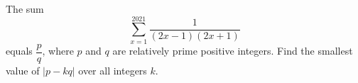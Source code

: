 The sum
\[\sum_{x=1}^{2021}\dfrac{1}{(2x-1)(2x+1)}\]
equals $\dfrac pq$, where $p$ and $q$ are relatively prime positive integers. Find the smallest value of $|p-kq|$ over all integers $k$.
